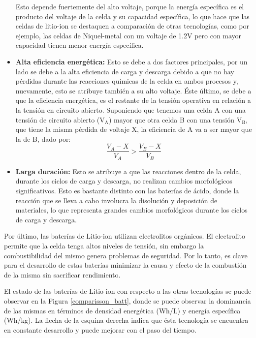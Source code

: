 \documentclass[10pt,a4paper]{article}
\begin{document}
\begin{itemize}
	Esto depende fuertemente del  alto voltaje, porque la energía específica es 
    el producto del voltaje de la celda y su capacidad específica, lo que hace 
    que las celdas de litio-ion se destaquen a comparación de otras tecnologías, 
	como por ejemplo, las celdas de Niquel-metal con un voltaje de 1.2V 
	pero con mayor capacidad tienen menor energía específica. 
    \item \textbf{Alta eficiencia energética:} Esto se debe a dos 
	factores principales, por un lado se debe a la alta eficiencia de 
	carga y descarga debido a que no hay pérdidas durante las reacciones 
	químicas de la celda en ambos procesos y, nuevamente, esto se atribuye 
	también a su alto voltaje. Éste último, se debe a que la eficiencia 
	energética, es el restante de la tensión operativa en relación a la 
	tensión en circuito abierto. Suponiendo que tenemos una celda A con una 
	tensión de circuito abierto ($\mathrm{V_A}$) mayor que otra celda B con 
	una tensión $\mathrm{V_B}$, que tiene la misma pérdida de voltaje X, 
	la eficiencia de A va a ser mayor que la de B, dado por:
	\vspace{5mm}
	\begin{equation}
	    \frac{V_A - X}{V_A} > \frac{V_B - X}{V_B} \nonumber
	\end{equation}
    \item \textbf{Larga duración:} Esto se atribuye a que las reacciones 
	dentro de la celda, durante los ciclos de carga y descarga, no realizan 
	cambios morfológicos significativos. Esto es bastante distinto con las 
	baterías de ácido, donde la reacción que se lleva a cabo involucra la 
	disolución y deposición de materiales, lo que representa grandes 
	cambios morfológicos durante los ciclos de carga y descarga.
\end{itemize}

\noindent Por último, las baterías de Litio-ion utilizan electrolitos orgánicos.
El electrolito permite que la celda tenga altos niveles de tensión, sin embargo
la combustibilidad del mismo genera problemas de seguridad. Por lo tanto, es
clave para el desarrollo de estas baterías minimizar la causa y efecto de la
combustión de la misma sin sacrificar rendimiento.

\noindent El estado de las baterías de Litio-ion con respecto a las otras
tecnologías se puede observar en la Figura \ref{comparisson_batt}, donde se
puede observar la dominancia de las mismas en términos de densidad energética 
(Wh/L) y energía específica (Wh/kg). La flecha de la esquina derecha indica que 
ésta tecnología se encuentra en constante desarrollo y puede mejorar con el 
paso del tiempo.
\end{document}
